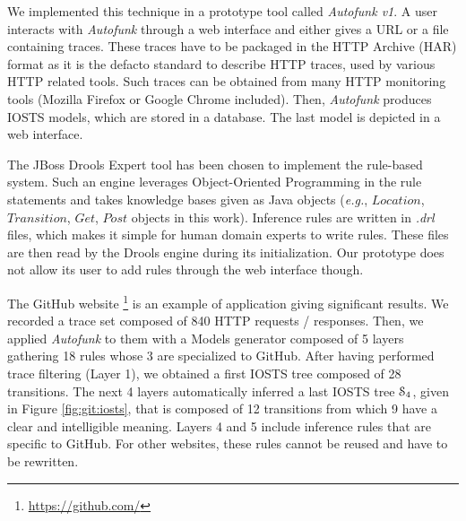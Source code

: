 We implemented this technique in a prototype tool called
\textit{Autofunk v1}. A user interacts with \textit{Autofunk}
through a web interface and either gives a URL or a file
containing traces.  These traces have to be packaged in the HTTP
Archive (HAR) format as it is the defacto standard to describe
HTTP traces, used by various HTTP related tools. Such traces can
be obtained from many HTTP monitoring tools (Mozilla Firefox or
Google Chrome included).  Then, \textit{Autofunk} produces IOSTS
models, which are stored in a database. The last model is
depicted in a web interface.

The JBoss Drools Expert tool has been chosen to implement the
rule-based system. Such an engine leverages Object-Oriented
Programming in the rule statements and takes knowledge bases
given as Java objects (\emph{e.g.}, $Location$, $Transition$,
$Get$, $Post$ objects in this work). Inference rules are written
in \emph{.drl} files, which makes it simple for human domain
experts to write rules. These files are then read by the Drools
engine during its initialization. Our prototype does not allow
its user to add rules through the web interface though.

The GitHub website \footnote{\url{https://github.com/}} is an
example of application giving significant results. We recorded a
trace set composed of 840 HTTP requests / responses. Then, we
applied \textit{Autofunk} to them with a Models generator
composed of 5 layers gathering 18 rules whose 3 are specialized
to GitHub. After having performed trace filtering (Layer 1), we
obtained a first IOSTS tree composed of 28 transitions. The next
4 layers automatically inferred a last IOSTS tree
$\EuScript{S}_4$, given in Figure \ref{fig:git:iosts}, that is
composed of 12 transitions from which 9 have a clear and
intelligible meaning. Layers 4 and 5 include inference rules that
are specific to GitHub. For other websites, these rules cannot be
reused and have to be rewritten.

